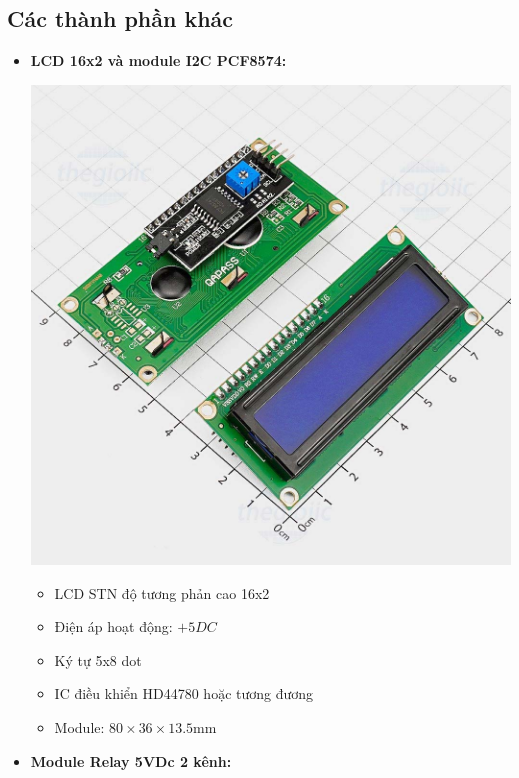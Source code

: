 	\subsection{Các thành phần khác}
	
	\begin{itemize}[label=-]
		\item \textbf{LCD 16x2 và module I2C PCF8574:}
		
		\begin{minipage}{0.3\linewidth}
			\includegraphics[width=\linewidth]{./picture/lcd.png}
		\end{minipage}
		\begin{minipage}{0.7\linewidth}		
			\begin{itemize}[label = -]
				\item LCD STN độ tương phản cao 16x2
				\item Điện áp hoạt động: $+5DC$
				\item Ký tự 5x8 dot
				\item IC điều khiển HD44780 hoặc tương đương
				\item Module: $80 \times 36 \times 13.5$mm
			\end{itemize}
		\end{minipage}
		\item \textbf{Module Relay 5VDc 2 kênh:}
		

\end{itemize}
